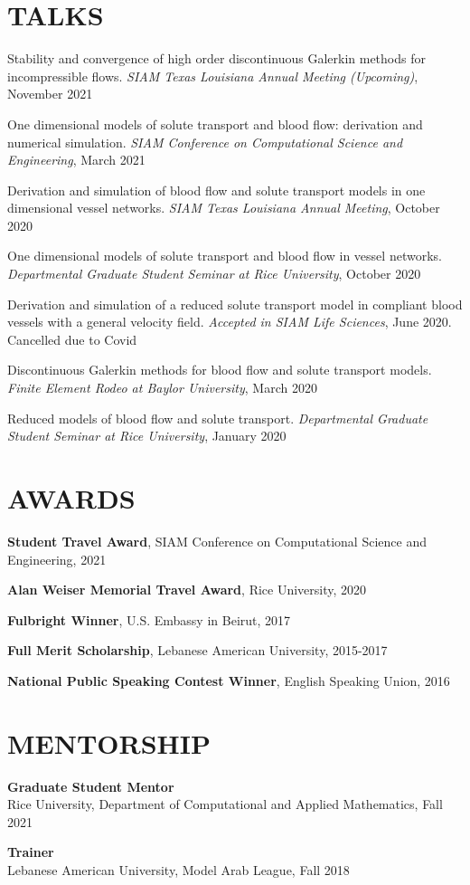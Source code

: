 \documentclass[margin]{res}
\begin{document}
\begin{resume}
\section{TALKS}
Stability and convergence of high order discontinuous Galerkin methods for incompressible flows. \textit{SIAM Texas Louisiana Annual Meeting (Upcoming)}, November 2021 
\par One dimensional models of solute transport and blood flow: derivation and numerical simulation. \textit{SIAM Conference on Computational Science and Engineering}, March  2021
\par Derivation and simulation of blood flow and solute transport models in one dimensional vessel networks.\textit{ SIAM Texas Louisiana Annual Meeting}, October 2020
\par One dimensional models of solute transport and blood flow in vessel networks. \textit{Departmental Graduate Student Seminar at Rice University}, October 2020
\par Derivation and simulation of a reduced solute transport model in compliant blood vessels with a general velocity field.  \textit{Accepted in SIAM Life Sciences}, June 2020. Cancelled due to Covid
\par 
Discontinuous Galerkin methods for blood flow and solute transport models.\textit{ Finite Element Rodeo at Baylor University}, March 2020
\par 
 Reduced models of blood flow and solute transport. \textit{Departmental Graduate Student Seminar at Rice University}, January 2020
\section{AWARDS}
\textbf{Student Travel Award}, SIAM Conference on Computational Science and Engineering, 2021 
\par
\textbf{Alan Weiser Memorial Travel Award}, Rice University, 2020
\par 
\textbf{Fulbright Winner}, U.S. Embassy in Beirut,  2017
\par
\textbf{Full Merit Scholarship}, Lebanese American University, 2015-2017  \par
\textbf{National Public Speaking Contest  Winner}, English Speaking Union, 2016 

\section{MENTORSHIP}
\textbf{Graduate Student Mentor} \\
Rice University, Department of Computational and Applied Mathematics, Fall 2021  \par 
\textbf{Trainer}  \\ 
Lebanese American University, Model Arab League, Fall 2018    

\end{resume}
\end{document}
